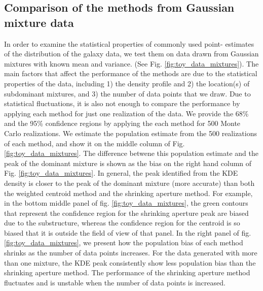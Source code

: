 \subsection{Comparison of the methods from Gaussian mixture data}
In order to examine the statistical properties of commonly used point-
estimates of the distribution of the galaxy data, we test them on data drawn 
from Gaussian mixtures with known mean and variance. 
(See Fig.
\ref{fig:toy_data_mixtures}). 
The main factors that affect the performance of 
the methods are due to the statistical properties of the data, 
including 1) the density profile and 2) the
location(s) of subdominant mixtures, and 3) the number of data points that we draw.
Due to statistical fluctuations, it is also not enough to
compare the performance by applying each method for just one realization of the
data. We provide the 68\% and the 95\% confidence regions by applying the
each method for 500 Monte Carlo realizations.
We estimate the population estimate from the 500 realizations of each method, 
and show it on the middle column of Fig. \ref{fig:toy_data_mixtures}.
The difference betwene this population estimate and the peak of the dominant mixture 
is shown as the bias on the right hand column of Fig.
\ref{fig:toy_data_mixtures}.
In general, the peak identified from the KDE density is closer to the 
peak of the dominant mixture (more accurate) than 
both the weighted centroid method and the shrinking aperture method.
For example, in the bottom middle panel of fig. \ref{fig:toy_data_mixtures}, 
the green contours
that represent the confidence region for the shrinking aperture peak are
biased due to the substructure, whereas the confidence region for the centroid 
is so biased that it is outside the field of view of that panel.
In the right panel of fig. \ref{fig:toy_data_mixtures}, 
we present how the population bias of each method shrinks as the
number of data points increases. For the data generated with more than one mixture, 
the KDE peak consistently show less population bias than the shrinking aperture method. 
The performance of the shrinking aperture method fluctuates and is unstable when
the number of data points is increased.

